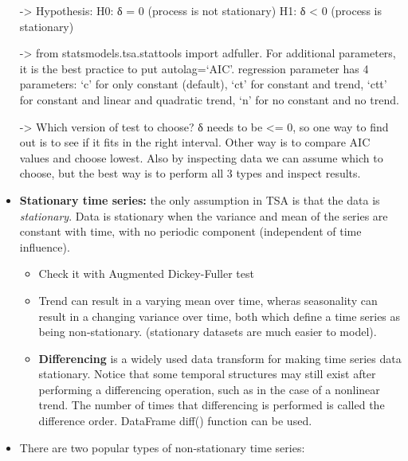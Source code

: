 \documentclass[
  letterpaper,
  DIV=11,
  numbers=noendperiod]{scrreprt}
\providecommand{\tightlist}{%
  \setlength{\itemsep}{0pt}\setlength{\parskip}{0pt}}\usepackage{longtable,booktabs,array}
\begin{document}
\begin{itemize}
  -\textgreater{} Hypothesis: H0: δ = 0 (process is not stationary) H1:
  δ \textless{} 0 (process is stationary)

  -\textgreater{} from statsmodels.tsa.stattools import adfuller. For
  additional parameters, it is the best practice to put autolag=`AIC'.
  regression parameter has 4 parameters: `c' for only constant
  (default), `ct' for constant and trend, `ctt' for constant and linear
  and quadratic trend, `n' for no constant and no trend.

  -\textgreater{} Which version of test to choose? δ needs to be
  \textless= 0, so one way to find out is to see if it fits in the right
  interval. Other way is to compare AIC values and choose lowest. Also
  by inspecting data we can assume which to choose, but the best way is
  to perform all 3 types and inspect results.
\item
  \textbf{Stationary time series:} the only assumption in TSA is that
  the data is \emph{stationary}. Data is stationary when the variance
  and mean of the series are constant with time, with no periodic
  component (independent of time influence).

  \begin{itemize}
  \tightlist
  \item
    Check it with Augmented Dickey-Fuller test
  \item
    Trend can result in a varying mean over time, wheras seasonality can
    result in a changing variance over time, both which define a time
    series as being non-stationary. (stationary datasets are much easier
    to model).
  \item
    \textbf{Differencing} is a widely used data transform for making
    time series data stationary. Notice that some temporal structures
    may still exist after performing a differencing operation, such as
    in the case of a nonlinear trend. The number of times that
    differencing is performed is called the difference order. DataFrame
    diff() function can be used.
  \end{itemize}
\item
  There are two popular types of non-stationary time series:


\end{itemize}
\end{document}
